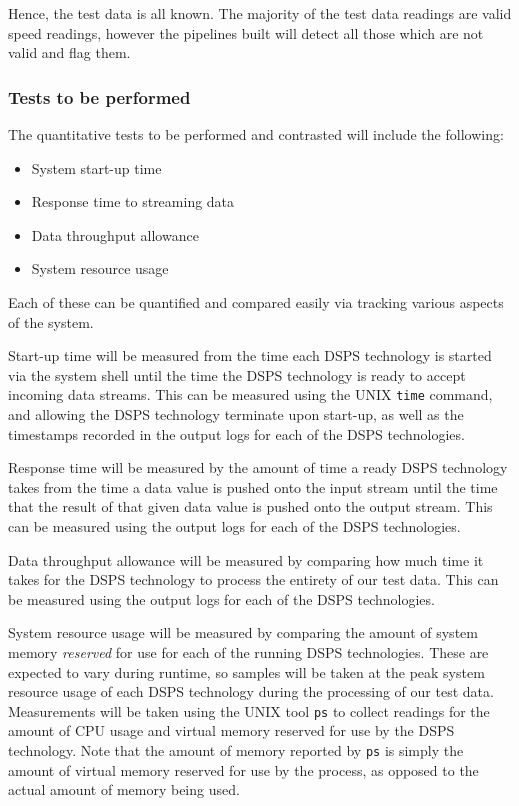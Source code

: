 Hence, the test data is all known. The majority of the test data readings are valid speed readings, however the pipelines
built will detect all those which are not valid and flag them.



\subsubsection{Tests to be performed} %
\label{ssub:tests_to_be_performed}

The quantitative tests to be performed and contrasted will include the following:

\begin{itemize}
  \item System start-up time
  \item Response time to streaming data
  \item Data throughput allowance
  \item System resource usage
\end{itemize}

Each of these can be quantified and compared easily via tracking various aspects of the system.

Start-up time will
be measured from the time each DSPS technology is started via the system shell until the time the DSPS technology is
ready to accept incoming data streams. This can be measured using the UNIX \texttt{time} command, and allowing the
DSPS technology terminate upon start-up, as well as the timestamps recorded in the output logs for each of the DSPS
technologies.

Response time will be measured by the amount of time a ready DSPS technology takes from the time a data value is pushed
onto the input stream until the time that the result of that given data value is pushed onto the output stream. This
can be measured using the output logs for each of the DSPS technologies.

Data throughput allowance will be measured by comparing how much time it takes for the DSPS technology to process the
entirety of our test data. This can be measured using the output logs for each of the DSPS technologies.

System resource usage will be measured by comparing the amount of system memory \textit{reserved} for use for each
of the running DSPS technologies. These are expected to vary during runtime, so samples will be taken at the peak system
resource usage of each DSPS technology during the processing of our test data.
Measurements will be taken using the UNIX tool
\texttt{ps} to collect readings for the amount of CPU usage and virtual memory reserved for use by the DSPS technology.
Note that the amount of memory reported by \texttt{ps} is simply the amount of virtual memory reserved for use by the
process, as opposed to the actual amount of memory being used.

